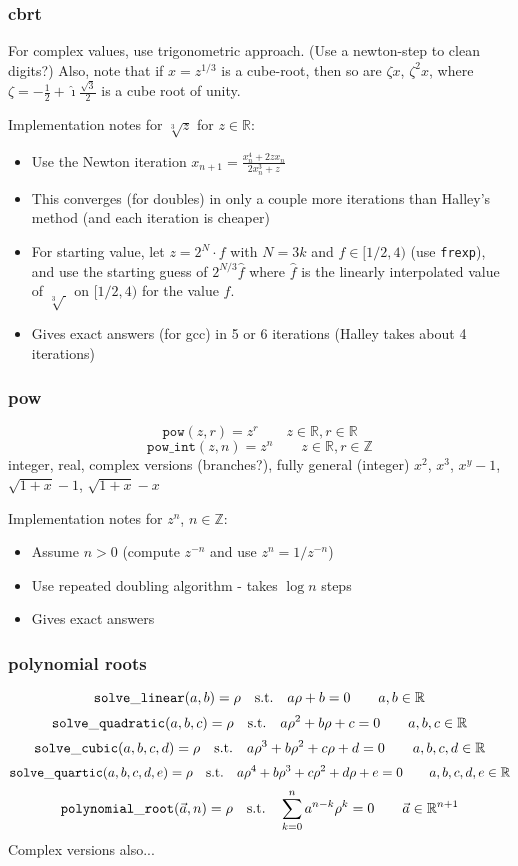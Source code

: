 \documentclass[10pt,dvipdfmx,letterpaper,twoside]{article}
\newcommand{\F}[1]{{\mathtt{#1}}}
\newcommand{\RR}{{\mathbb{R}}}
\newcommand{\ZZ}{{\mathbb{Z}}}
\newcommand{\ii}{{\hat{\imath}}}
\newenvironment{implementation}{\noindent\begin{framed}}{\end{framed}}
\begin{document}
\subsubsection{cbrt}
For complex values, use trigonometric approach.  (Use a newton-step to clean digits?)
Also, note that if $x=z^{1/3}$ is a cube-root, then so are $\zeta x$, $\zeta^2 x$, where $\zeta=-\frac12+\ii\frac{\sqrt{3}}{2}$ is a cube root of unity.
\begin{implementation}
Implementation notes for $\sqrt[3]{z}$ for $z\in\RR$:
\begin{itemize}
\item Use the Newton iteration $x_{n+1} = \frac{x_n^4 + 2 z x_n}{2 x_n^3 + z}$
\item This converges (for doubles) in only a couple more iterations than Halley's method (and each iteration is cheaper)
\item For starting value, let $z=2^N\cdot f$ with $N=3k$ and $f\in[1/2, 4)$ (use {\tt frexp}),
  and use the starting guess of $2^{N/3}\widehat{f}$ where $\widehat{f}$ is the linearly interpolated value of $\sqrt[3]{\ }$ on $[1/2,4)$
  for the value $f$.
\item Gives exact answers (for gcc) in 5 or 6 iterations (Halley takes about 4 iterations)
\end{itemize}
\end{implementation}

\subsubsection{pow}
\[ \F{pow}(z,r) = z^{r} \qquad z\in\RR, r\in\RR \]
\[ \F{pow\_int}(z,n) = z^{n} \qquad z\in\RR, r\in\ZZ \]
integer, real, complex versions (branches?), fully general (integer)
$x^2$, $x^3$, $x^y-1$, $\sqrt{1+x}-1$, $\sqrt{1+x}-x$

\begin{implementation}
Implementation notes for $z^n$, $n\in\ZZ$:
\begin{itemize}
\item Assume $n>0$ (compute $z^{-n}$ and use $z^n = 1/z^{-n}$)
\item Use repeated doubling algorithm - takes $\log n$ steps
\item Gives exact answers
\end{itemize}
\end{implementation}

\subsubsection{polynomial roots}
\[ \F{solve\_linear}(a,b) = \rho \text{\quad s.t.\quad } a\rho+b=0 \qquad a,b\in\RR \]
\[ \F{solve\_quadratic}(a,b,c) = \rho \text{\quad s.t.\quad } a\rho^2+b\rho+c=0 \qquad a,b,c\in\RR \]
\[ \F{solve\_cubic}(a,b,c,d) = \rho \text{\quad s.t.\quad } a\rho^3+b\rho^2+c\rho+d=0 \qquad a,b,c,d\in\RR \]
\[ \F{solve\_quartic}(a,b,c,d,e) = \rho \text{\quad s.t.\quad } a\rho^4+b\rho^3+c\rho^2+d\rho+e=0 \qquad a,b,c,d,e\in\RR \]
\[ \F{polynomial\_root}(\vec{a},n) = \rho \text{\quad s.t.\quad } \sum_{k=0}^{n}a^{n-k}\rho^k=0 \qquad \vec{a}\in\RR^{n+1} \]
Complex versions also...
\end{document}

